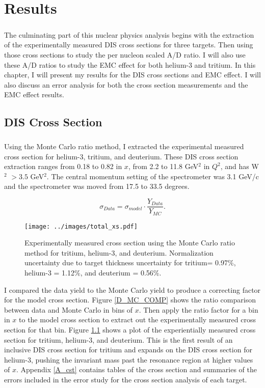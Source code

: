 
\chapter{Results}
\paragraph{}The culminating part of this nuclear physics analysis begins with the extraction of the experimentally measured DIS cross sections for three targets. Then using those cross sections to study the per nucleon scaled A/D ratio. I will also use these A/D ratios to study the EMC effect for both helium-3 and tritium. In this chapter, I will present my results for the DIS cross sections and EMC effect. I will also discuss an error analysis for both the cross section measurements and the EMC effect results. 
\section{DIS Cross Section}
\paragraph{}Using the Monte Carlo ratio method, I extracted the experimental measured cross section for helium-3, tritium, and deuterium. These DIS cross section extraction ranges from 0.18 to 0.82 in $x$, from 2.2 to 11.8 GeV$^2$ in $Q^2$, and has W$^2$ $>3.5$ GeV$^2$. The central momentum setting of the spectrometer was 3.1 GeV/c and the spectrometer was moved from 17.5 to 33.5 degrees.


\begin{equation}
\sigma_{Data} = \sigma_{model} \cdot \frac{Y_{Data}}{Y_{MC}}. \nonumber
\end{equation}
\begin{figure}
	\texttt{[image: ../images/total\_xs.pdf]}
	\caption{Experimentally measured cross section using the Monte Carlo ratio method for tritium, helium-3, and deuterium. Normalization uncertainty due to target thickness uncertainty for tritium= 0.97\%, helium-3 = 1.12\%, and deuterium = 0.56\%.}
    \label{CCplot}
\end{figure}
I compared the data yield to the Monte Carlo yield to produce a correcting factor for the model cross section. Figure \ref{D_MC_COMP} shows the ratio comparison between data and Monte Carlo in bins of $x$. Then apply the ratio factor for a bin in $x$ to the model cross section to extract out the experimentally measured cross section for that bin. Figure \ref{CCplot} shows a plot of the experientially measured cross section for tritium, helium-3, and deuterium.  This is the first result of an inclusive DIS cross section for tritium and expands on the DIS cross section for helium-3, pushing the invariant mass past the resonance region at higher values of $x$.  Appendix \ref{A_cst} contains tables of the cross section and summaries of the errors included in the error study for the cross section analysis of each target. 

